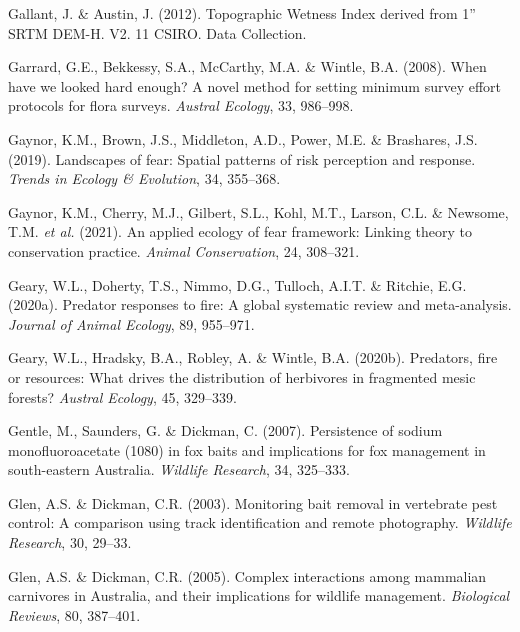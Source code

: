 \documentclass[11pt,a4paper,titlepage,twoside,openright]{style/unimelbthesis}
\begin{document}
\begin{mainmatter}
\leavevmode\hypertarget{ref-gallant2012topographic}{}%
Gallant, J. \& Austin, J. (2012). Topographic Wetness Index derived from 1'' SRTM DEM-H. V2. 11 CSIRO. Data Collection.

\leavevmode\hypertarget{ref-garrard2008when}{}%
Garrard, G.E., Bekkessy, S.A., McCarthy, M.A. \& Wintle, B.A. (2008). When have we looked hard enough? A novel method for setting minimum survey effort protocols for flora surveys. \emph{Austral Ecology}, 33, 986--998.

\leavevmode\hypertarget{ref-gaynor2019landscapes}{}%
Gaynor, K.M., Brown, J.S., Middleton, A.D., Power, M.E. \& Brashares, J.S. (2019). Landscapes of fear: Spatial patterns of risk perception and response. \emph{Trends in Ecology \& Evolution}, 34, 355--368.

\leavevmode\hypertarget{ref-gaynor2021applied}{}%
Gaynor, K.M., Cherry, M.J., Gilbert, S.L., Kohl, M.T., Larson, C.L. \& Newsome, T.M. \emph{et al.} (2021). An applied ecology of fear framework: Linking theory to conservation practice. \emph{Animal Conservation}, 24, 308--321.

\leavevmode\hypertarget{ref-geary2020predator}{}%
Geary, W.L., Doherty, T.S., Nimmo, D.G., Tulloch, A.I.T. \& Ritchie, E.G. (2020a). Predator responses to fire: A global systematic review and meta-analysis. \emph{Journal of Animal Ecology}, 89, 955--971.

\leavevmode\hypertarget{ref-geary2020predators}{}%
Geary, W.L., Hradsky, B.A., Robley, A. \& Wintle, B.A. (2020b). Predators, fire or resources: What drives the distribution of herbivores in fragmented mesic forests? \emph{Austral Ecology}, 45, 329--339.

\leavevmode\hypertarget{ref-gentle2007persistence}{}%
Gentle, M., Saunders, G. \& Dickman, C. (2007). Persistence of sodium monofluoroacetate (1080) in fox baits and implications for fox management in south-eastern Australia. \emph{Wildlife Research}, 34, 325--333.

\leavevmode\hypertarget{ref-glen2003monitoring}{}%
Glen, A.S. \& Dickman, C.R. (2003). Monitoring bait removal in vertebrate pest control: A comparison using track identification and remote photography. \emph{Wildlife Research}, 30, 29--33.

\leavevmode\hypertarget{ref-glen2005complex}{}%
Glen, A.S. \& Dickman, C.R. (2005). Complex interactions among mammalian carnivores in Australia, and their implications for wildlife management. \emph{Biological Reviews}, 80, 387--401.


\end{mainmatter}
\end{document}
